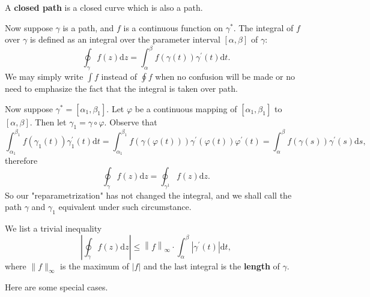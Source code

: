 A \textbf{closed path} is a closed curve which is also a path.\par
Now suppose $\gamma$ is a path, and $f$ is a continuous function on $\gamma^*$. The integral of $f$ over $\gamma$ is defined as an integral over the parameter interval $[\alpha,\beta]$ of $\gamma$: 
$$
\oint_{\gamma}{f\left( z \right) \mathrm{d}z}=\int_{\alpha}^{\beta}{f\left( \gamma \left( t \right) \right) \gamma ^{\prime}\left( t \right) \mathrm{d}t}.
$$
We may simply write $\int f$ instead of $\oint f$ when no confusion will be made or no need to emphasize the fact that the integral is taken over path.\par
Now suppose $\gamma^*=[\alpha_1,\beta_1]$. Let $\varphi$ be a continuous mapping of $[\alpha_1,\beta_1]$ to $[\alpha,\beta]$. Then let $\gamma_1=\gamma\circ\varphi$. Observe that 
$$
\int_{\alpha _1}^{\beta _1}{f\left( \gamma _1\left( t \right) \right) \gamma _{1}^{\prime}\left( t \right) \mathrm{d}t}=\int_{\alpha _1}^{\beta _1}{f\left( \gamma \left( \varphi \left( t \right) \right) \right) \gamma ^{\prime}\left( \varphi \left( t \right) \right) \varphi ^{\prime}\left( t \right)}=\int_{\alpha}^{\beta}{f\left( \gamma \left( s \right) \right) \gamma ^{\prime}\left( s \right) \mathrm{d}s},
$$
therefore 
$$
\oint_{\gamma}{f\left( z \right) \mathrm{d}z}=\oint_{\gamma ^1}{f\left( z \right) \mathrm{d}z}.
$$
So our "reparametrization" has not changed the integral, and we shall call the path $\gamma$ and $\gamma_1$ equivalent under such circumstance.\par
We list a trivial inequality 
$$
\left| \oint_{\gamma}{f\left( z \right) \mathrm{d}z} \right|\le \left\| f \right\| _{\infty}\cdot \int_{\alpha}^{\beta}{\left| \gamma ^{\prime}\left( t \right) \right|\mathrm{d}t},
$$
where $\|f\|_\infty$ is the maximum of $|f|$ and the last integral is the \textbf{length} of $\gamma$.\par
Here are some special cases.
